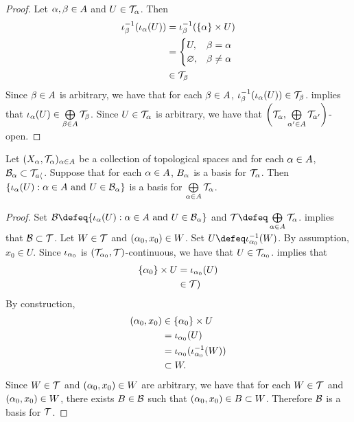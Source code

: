 \documentclass{book}
\begin{document}
	\begin{proof}
		Let $\alpha, \beta \in A$ and $U \in \mathcal{T}_{\alpha}$. Then  
		\begin{align*}
			\iota_{\beta}^{-1}(\iota_{\alpha}(U))  
			& = \iota_{\beta}^{-1}(\{\alpha\} \times U) \\
			& = 
			\begin{cases}
				U, & \beta = \alpha \\
				\varnothing, & \beta \neq \alpha
			\end{cases} \\
			& \in \mathcal{T}_{\beta}
		\end{align*}
		Since $\beta \in A$ is arbitrary, we have that for each $\beta \in A$, $\iota_{\beta}^{-1}(\iota_{\alpha}(U)) \in \mathcal{T}_{\beta}$.  implies that $\iota_{\alpha}(U) \in \bigoplus\limits_{\beta \in A} \mathcal{T}_{\beta}$. Since $U \in \mathcal{T}_{\alpha}$ is arbitrary, we have that $\bigg(\mathcal{T}_{\alpha}, \bigoplus\limits_{\alpha' \in A} \mathcal{T}_{\alpha'} \bigg)$-open.
	\end{proof}

	\begin{ex} 
		Let $(X_{\alpha}, \mathcal{T}_{\alpha})_{\alpha \in A}$ be a collection of topological spaces and for each $\alpha \in A$, $\mathcal{B}_{\alpha} \subset \mathcal{T}_{a\langle}$. Suppose that for each $\alpha \in A$, $B_{\alpha}$ is a basis for $\mathcal{T}_{\alpha}$. Then 
		$\{ \iota_{\alpha}(U) : \text{$\alpha \in A$ and $U \in \mathcal{B}_{\alpha}$} \}$ is a basis for $\bigoplus\limits_{\alpha \in A} \mathcal{T}_{\alpha}$.
	\end{ex}

	\begin{proof}
		Set $\MB \defeq \{ \iota_{\al}(U) : \text{$\al \in A$ and $U \in \MB_{\al}$} \}$ and $\MT \defeq \bigoplus\limits_{\al \in A} \MT_{\al}$.  implies that $\mathcal{B} \subset \mathcal{T}$. Let $W \in \mathcal{T}$ and $(\alpha_0, x_0) \in W$. Set $U \defeq \iota_{\al_0}^{-1}(W)$. By assumption, $x_0 \in U$. Since $\iota_{\alpha_0}$ is $(\mathcal{T}_{\alpha_0}, \mathcal{T})$-continuous, we have that $U \in \mathcal{T}_{\alpha_0}$.  implies that  
		\begin{align*}
			\{\alpha_0 \} \times U
			& = \iota_{\alpha_0}(U) \\
			& \in \mathcal{T})
		\end{align*}
		By construction, 
		\begin{align*}
			(\alpha_0, x_0)
			& \in \{\alpha_0 \} \times U \\
			& = \iota_{\alpha_0}(U) \\
			& = \iota_{\alpha_0} (\iota_{\alpha_0}^{-1}(W)) \\
			& \subset W.
		\end{align*}
		Since $W \in \mathcal{T}$ and $(\alpha_0, x_0) \in W$ are arbitrary, we have that for each $W \in \mathcal{T}$ and $(\alpha_0, x_0) \in W$, there exists $B \in \mathcal{B}$ such that $(\alpha_0, x_0) \in B \subset W$. Therefore $\mathcal{B}$ is a basis for $\mathcal{T}$.
	\end{proof}
\end{document}
